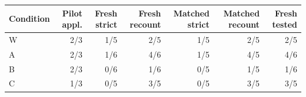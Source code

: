 \begin{tabular}{lrrrrrr}
\toprule
Condition & Pilot appl. & Fresh strict & Fresh recount & Matched strict & Matched recount & Fresh tested \\
\midrule
W & 2/3 & 1/5 & 2/5 & 1/5 & 2/5 & 2/5 \\
A & 2/3 & 1/6 & 4/6 & 1/5 & 4/5 & 4/6 \\
B & 2/3 & 0/6 & 1/6 & 0/5 & 1/5 & 1/6 \\
C & 1/3 & 0/5 & 3/5 & 0/5 & 3/5 & 3/5 \\
\bottomrule
\end{tabular}
